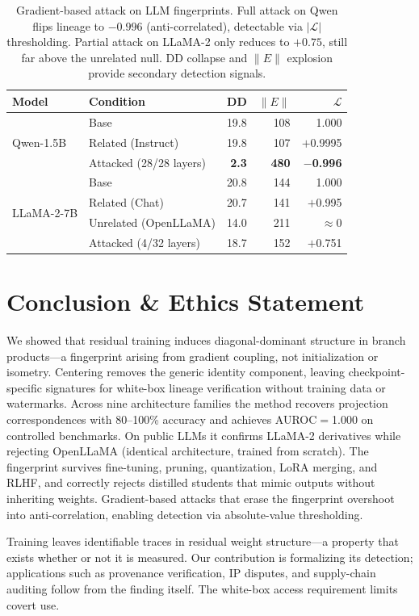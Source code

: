\documentclass[letterpaper]{article}
\begin{document}
\begin{table}[t]
\centering
\small
\setlength{\tabcolsep}{3pt}
\begin{tabular}{@{}llrrr@{}}
\toprule
Model & Condition & DD & $\|E\|$ & $\mathcal{L}$ \\
\midrule
\multirow{3}{*}{Qwen-1.5B}
  & Base & 19.8 & 108 & 1.000 \\
  & Related (Instruct) & 19.8 & 107 & $+$0.9995 \\
  & Attacked (28/28 layers) & \textbf{2.3} & \textbf{480} & $\mathbf{-}$\textbf{0.996} \\
\midrule
\multirow{4}{*}{LLaMA-2-7B}
  & Base & 20.8 & 144 & 1.000 \\
  & Related (Chat) & 20.7 & 141 & $+$0.995 \\
  & Unrelated (OpenLLaMA) & 14.0 & 211 & ${\approx}$0 \\
  & Attacked (4/32 layers) & 18.7 & 152 & $+$0.751 \\
\bottomrule
\end{tabular}
\caption{Gradient-based attack on LLM fingerprints. Full attack on Qwen flips lineage to $-0.996$ (anti-correlated), detectable via $|\mathcal{L}|$ thresholding. Partial attack on LLaMA-2 only reduces to $+0.75$, still far above the unrelated null. DD collapse and $\|E\|$ explosion provide secondary detection signals.}
\label{tab:llm-attack}
\end{table}

\section{Conclusion \& Ethics Statement}

We showed that residual training induces diagonal-dominant structure in branch products---a fingerprint arising from gradient coupling, not initialization or isometry. Centering removes the generic identity component, leaving checkpoint-specific signatures for white-box lineage verification without training data or watermarks. Across nine architecture families the method recovers projection correspondences with 80--100\% accuracy and achieves AUROC$=$1.000 on controlled benchmarks. On public LLMs it confirms LLaMA-2 derivatives while rejecting OpenLLaMA (identical architecture, trained from scratch). The fingerprint survives fine-tuning, pruning, quantization, LoRA merging, and RLHF, and correctly rejects distilled students that mimic outputs without inheriting weights. Gradient-based attacks that erase the fingerprint overshoot into anti-correlation, enabling detection via absolute-value thresholding.

Training leaves identifiable traces in residual weight structure---a property that exists whether or not it is measured. Our contribution is formalizing its detection; applications such as provenance verification, IP disputes, and supply-chain auditing follow from the finding itself. The white-box access requirement limits covert use.

\clearpage
\raggedbottom

\end{document}
